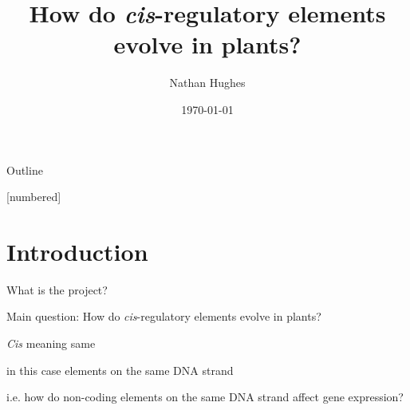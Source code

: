 \documentclass[t, aspectratio=169, allowframebreaks]{beamer}
\author{Nathan Hughes}
\date{\today}
\title{How do \emph{cis}-regulatory elements evolve in plants?}
\begin{document}
\maketitle
\begin{frame}{Outline}
\tableofcontents
\end{frame}

\let\tempone\itemize
\let\temptwo\enditemize
\renewenvironment{itemize}{\tempone\addtolength{\itemsep}{0.6\baselineskip}}{\temptwo}






[numbered]



\section{Introduction}
\label{sec:org4e35c5a}
\begin{frame}[label={sec:orge90f659}]{What is the project?}
\begin{block}{\alert{Main question}: How do \emph{cis}-regulatory elements evolve in plants?}
\begin{itemize}
\item \emph{Cis} meaning same
\begin{itemize}
\item in this case elements on the same DNA strand
\end{itemize}
\item i.e. how do non-coding elements on the same DNA strand affect gene expression?
\end{itemize}
\end{block}
\end{frame}
\end{document}

